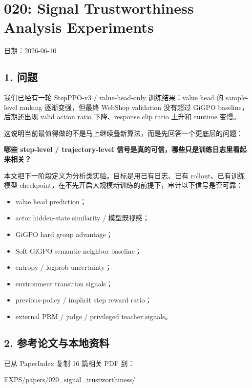 \documentclass[
  10pt,
]{ctexart}
\author{}
\date{2026-06-10}
\newenvironment{Shaded}{}{}
\newcommand{\NormalTok}[1]{#1}
\providecommand{\tightlist}{%
  \setlength{\itemsep}{0pt}\setlength{\parskip}{0pt}}
\begin{document}
\section{020: Signal Trustworthiness Analysis
Experiments}\label{signal-trustworthiness-analysis-experiments}

日期：2026-06-10

\subsection{1. 问题}\label{ux95eeux9898}

我们已经有一轮 StepPPO-v3 / value-head-only 训练结果：value head 的
sample-level ranking 逐渐变强，但最终 WebShop validation 没有超过 GiGPO
baseline，后期还出现 valid action ratio 下降、response clip ratio 上升和
runtime 变慢。

这说明当前最值得做的不是马上继续叠新算法，而是先回答一个更底层的问题：

\textbf{哪些 step-level / trajectory-level
信号是真的可信，哪些只是训练日志里看起来相关？}

本文把下一阶段定义为分析类实验。目标是用已有日志、已有
rollout、已有训练模型
checkpoint，在不先开启大规模新训练的前提下，审计以下信号是否可靠：

\begin{itemize}
\tightlist
\item
  value head prediction；
\item
  actor hidden-state similarity / 模型既视感；
\item
  GiGPO hard group advantage；
\item
  Soft-GiGPO semantic neighbor baseline；
\item
  entropy / logprob uncertainty；
\item
  environment transition signals；
\item
  previous-policy / implicit step reward ratio；
\item
  external PRM / judge / privileged teacher signals。
\end{itemize}

\subsection{2.
参考论文与本地资料}\label{ux53c2ux8003ux8bbaux6587ux4e0eux672cux5730ux8d44ux6599}

已从 PaperIndex 复制 16 篇相关 PDF 到：

\begin{Shaded}
\begin{Highlighting}[]
\NormalTok{EXPS/papers/020\_signal\_trustworthiness/}
\end{Highlighting}
\end{Shaded}
\end{document}
